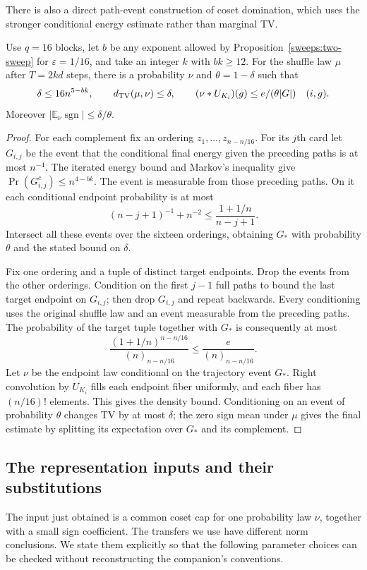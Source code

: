 There is also a direct path-event construction of coset domination, which
uses the stronger conditional energy estimate rather than marginal TV.

\begin{proposition}\label{sweeps:path-truncation}
Use $q=16$ blocks, let $b$ be any exponent allowed by
Proposition~\ref{sweeps:two-sweep} for $\varepsilon=1/16$, and take an
integer $k$ with $bk\ge12$.  For the shuffle law $\mu$ after $T=2kd$ steps,
there is a probability $\nu$ and $\theta=1-\delta$ such that
\[
 \delta\le16n^{5-bk},\qquad d_{\rm TV}(\mu,\nu)\le\delta,
 \qquad (\nu*U_{K_i})(g)\le e/(\theta|G|)\quad(i,g).
\]
Moreover $|\mathbb E_\nu\operatorname{sgn}|\le\delta/\theta$.
\end{proposition}
\begin{proof}
For each complement fix an ordering $z_1,\ldots,z_{n-n/16}$.
For its $j$th card let $G_{i,j}$ be the event that the conditional final
energy given the preceding paths is at most $n^{-4}$.
The iterated energy bound and Markov's inequality give
$\Pr(G_{i,j}^c)\le n^{4-bk}$.  The event is measurable from those preceding
paths.  On it each conditional endpoint probability is at most
\[
 (n-j+1)^{-1}+n^{-2}\le\frac{1+1/n}{n-j+1}.
\]
Intersect all these events over the sixteen orderings, obtaining $G_*$ with
probability $\theta$ and the stated bound on $\delta$.

Fix one ordering and a tuple of distinct target endpoints.  Drop the events
from the other orderings.  Condition on the first $j-1$ full paths to bound
the last target endpoint on $G_{i,j}$; then drop $G_{i,j}$ and repeat
backwards.  Every conditioning uses the original shuffle law and an event
measurable from the preceding paths.  The probability of the target tuple
together with $G_*$ is consequently at most
\[
 \frac{(1+1/n)^{n-n/16}}{(n)_{n-n/16}}\le\frac e{(n)_{n-n/16}}.
\]
Let $\nu$ be the endpoint law conditional on the trajectory event $G_*$.  Right convolution by $U_{K_i}$ fills
each endpoint fiber uniformly, and each fiber has $(n/16)!$ elements.
This gives the density bound.  Conditioning on an event of probability
$\theta$ changes TV by at most $\delta$; the zero sign mean under $\mu$
gives the final estimate by splitting its expectation over $G_*$ and its
complement.
\end{proof}


\subsection{The representation inputs and their substitutions}\label{sweeps:transfer-inputs}
The input just obtained is a common coset cap for one probability law
$\nu$, together with a small sign coefficient.  The transfers we use have
different norm conclusions.  We state them explicitly so that the
following parameter choices can be checked without reconstructing the
companion's conventions.


